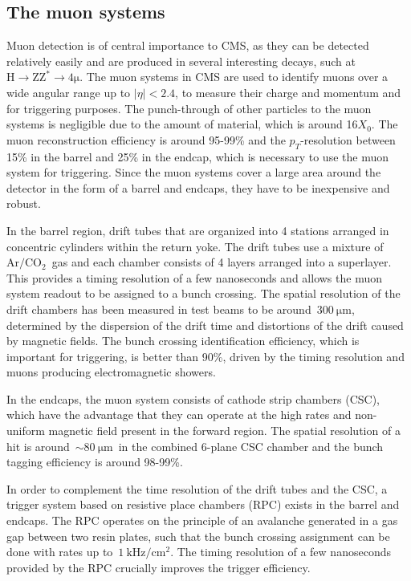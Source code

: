 \subsection{The muon systems}
Muon detection is of central importance to CMS, as they can be detected relatively easily and are produced in several interesting decays, such at $\mathrm{H} \rightarrow \mathrm{Z} \mathrm{Z}^* \rightarrow 4 \mathrm{\mu}$. The muon systems in CMS are used to identify muons over a wide angular range up to $|\eta| < 2.4$, to measure their charge and momentum and for triggering purposes. The punch-through of other particles to the muon systems is negligible due to the amount of material, which is around 16$X_0$. The muon reconstruction efficiency is around 95-99\% and the $p_T$-resolution between 15\% in the barrel and 25\% in the endcap, which is necessary to use the muon system for triggering. Since the muon systems cover a large area around the detector in the form of a barrel and endcaps, they have to be inexpensive and robust.

In the barrel region, drift tubes that are organized into 4 stations arranged in concentric cylinders within the return yoke. The drift tubes use a mixture of~$\mathrm{Ar}/\mathrm{CO}_2$~gas and each chamber consists of 4 layers arranged into a superlayer. This provides a timing resolution of a few nanoseconds and allows the muon system readout to be assigned to a bunch crossing. The spatial resolution of the drift chambers has been measured in test beams to be around~$300~\mathrm{\mu m}$, determined by the dispersion of the drift time and distortions of the drift caused by magnetic fields. The bunch crossing identification efficiency, which is important for triggering, is better than 90\%, driven by the timing resolution and muons producing electromagnetic showers.

In the endcaps, the muon system consists of cathode strip chambers (CSC), which have the advantage that they can operate at the high rates and non-uniform magnetic field present in the forward region. The spatial resolution of a hit is around~$\sim 80~\mathrm{\mu m}$~in the combined 6-plane CSC chamber and the bunch tagging efficiency is around 98-99\%.

In order to complement the time resolution of the drift tubes and the CSC, a trigger system based on resistive place chambers (RPC) exists in the barrel and endcaps. The RPC operates on the principle of an avalanche generated in a gas gap between two resin plates, such that the bunch crossing assignment can be done with rates up to~$1~\mathrm{kHz}/\mathrm{cm}^2$. The timing resolution of a few nanoseconds provided by the RPC crucially improves the trigger efficiency.


